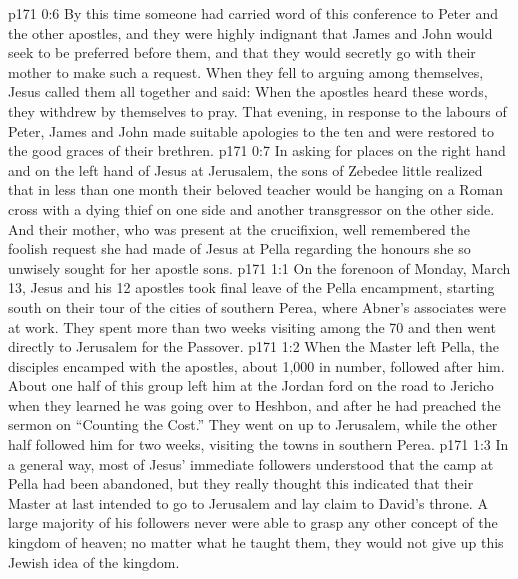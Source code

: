 \vs p171 0:6 By this time someone had carried word of this conference to Peter and the other apostles, and they were highly indignant that James and John would seek to be preferred before them, and that they would secretly go with their mother to make such a request. When they fell to arguing among themselves, Jesus called them all together and said:  When the apostles heard these words, they withdrew by themselves to pray. That evening, in response to the labours of Peter, James and John made suitable apologies to the ten and were restored to the good graces of their brethren.
\vs p171 0:7 In asking for places on the right hand and on the left hand of Jesus at Jerusalem, the sons of Zebedee little realized that in less than one month their beloved teacher would be hanging on a Roman cross with a dying thief on one side and another transgressor on the other side. And their mother, who was present at the crucifixion, well remembered the foolish request she had made of Jesus at Pella regarding the honours she so unwisely sought for her apostle sons.
\vs p171 1:1 On the forenoon of Monday, March 13, Jesus and his 12 apostles took final leave of the Pella encampment, starting south on their tour of the cities of southern Perea, where Abner’s associates were at work. They spent more than two weeks visiting among the 70 and then went directly to Jerusalem for the Passover.
\vs p171 1:2 When the Master left Pella, the disciples encamped with the apostles, about 1,000 in number, followed after him. About one half of this group left him at the Jordan ford on the road to Jericho when they learned he was going over to Heshbon, and after he had preached the sermon on “Counting the Cost.” They went on up to Jerusalem, while the other half followed him for two weeks, visiting the towns in southern Perea.
\vs p171 1:3 In a general way, most of Jesus’ immediate followers understood that the camp at Pella had been abandoned, but they really thought this indicated that their Master at last intended to go to Jerusalem and lay claim to David’s throne. A large majority of his followers never were able to grasp any other concept of the kingdom of heaven; no matter what he taught them, they would not give up this Jewish idea of the kingdom.
